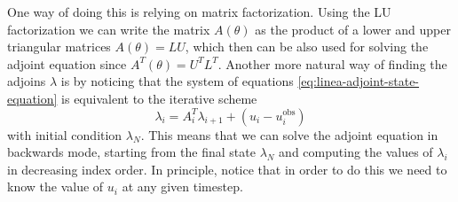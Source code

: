One way of doing this is relying on matrix factorization. 
Using the LU factorization we can write the matrix $A(\theta)$ as the product of a lower and upper triangular matrices $A (\theta) = LU$, which then can be also used for solving the adjoint equation since $A^T(\theta)=U^TL^T$.
Another more natural way of finding the adjoins $\lambda$ is by noticing that the system of equations \eqref{eq:linea-adjoint-state-equation} is equivalent to the iterative scheme
\begin{equation}
    \lambda_{i} = A_{i}^T \lambda_{i+1} + (u_i - u_i^\text{obs})
\end{equation}
with initial condition $\lambda_N$. 
This means that we can solve the adjoint equation in backwards mode, starting from the final state $\lambda_N$ and computing the values of $\lambda_i$ in decreasing index order. 
In principle, notice that in order to do this we need to know the value of $u_i$ at any given timestep. 




